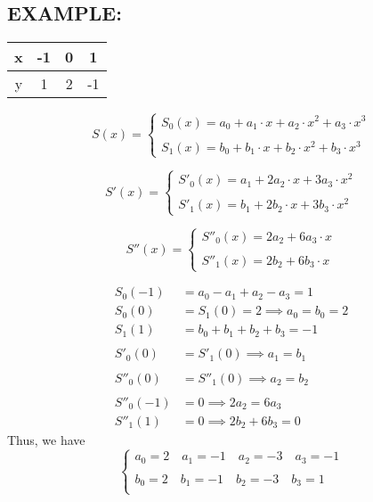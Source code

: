 \documentclass [9 pt]{article}
\theoremstyle{definition}
\begin{document}
\subsection*{EXAMPLE:}
\begin{center}
\begin{tabular}{ c|c c c } 
	x & -1 & 0 & 1\\
	\hline
	y & 1 & 2 & -1 
\end{tabular}
\end{center}
\begin{mdframed}
	$$
	S(x) = 
	\begin{cases}
		S_0(x) = a_0 + a_1\cdot x + a_2 \cdot x^2 + a_3 \cdot x^3\\
		\\
		S_1(x) = b_0 + b_1\cdot x + b_2 \cdot x^2 + b_3 \cdot x^3
	\end{cases}
	$$
	
	$$
	S'(x) = 
	\begin{cases}
		S'_0(x) = a_1 + 2  a_2 \cdot x + 3 a_3 \cdot x^2\\
		\\
		S'_1(x) = b_1 + 2b_2 \cdot x + 3b_3 \cdot x^2
	\end{cases}
	$$
	
	$$
	S''(x) = 
	\begin{cases}
		S''_0(x) = 2  a_2  + 6 a_3 \cdot x\\
		\\
		S''_1(x) = 2b_2  + 6b_3 \cdot x
	\end{cases}
	$$
	
	\begin{align*}
		S_0(-1) &= a_0 - a_1 + a_2 - a_3 = 1\\
		S_0(0) &= S_1(0) = 2 \implies a_0 = b_0 = 2\\
		S_1(1) &= b_0 + b_1 + b_2 + b_3 = -1\\
		&\quad\\
		S'_0(0)& = S'_1(0) \implies a_1 = b_1 \\ 
		&\quad\\
		S''_0(0) &= S''_1(0) \implies a_2 = b_2 \\
		&\quad\\
		S''_0(-1) &= 0 \implies 2a_2 = 6a_3\\
		S''_1(1) &= 0 \implies  2b_2 + 6b_3 = 0
	\end{align*}
	Thus, we have 
	$$ 
	\begin{cases}
		a_0 = 2 \quad a_1 = -1 \quad a_2 = -3 \quad a_3 = -1 \\
		\\
		b_0 = 2 \quad b_1 = -1 \quad b_2 = -3 \quad b_3 = 1 \\
	\end{cases} $$
	
\end{mdframed}
\end{document}
